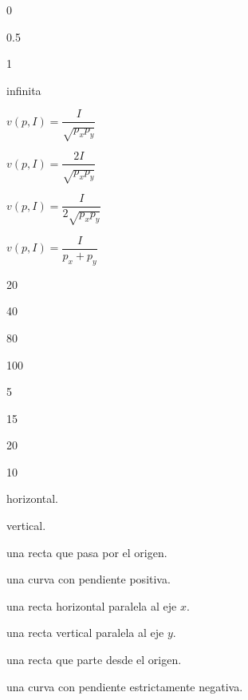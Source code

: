 \begin{opts}
    \item 0
    \item 0.5
    \item 1
    \item infinita
\end{opts}

\begin{opts}
    \item $v(p,I)=\dfrac{I}{\sqrt{p_xp_y}}$
    \item $v(p,I)=\dfrac{2I}{\sqrt{p_xp_y}}$
    \item $v(p,I)=\dfrac{I}{2\sqrt{p_xp_y}}$
    \item $v(p,I)=\dfrac{I}{p_x+p_y}$
\end{opts}

\begin{opts}
    \item 20
    \item 40
    \item 80
    \item 100
\end{opts}

\begin{opts}
    \item 5
    \item 15
    \item 20
    \item 10
\end{opts}

\begin{opts}
    \item horizontal.
    \item vertical.
    \item una recta que pasa por el origen.
    \item una curva con pendiente positiva.
\end{opts}

\begin{opts}
    \item una recta horizontal paralela al eje $x$.
    \item una recta vertical paralela al eje $y$.
    \item una recta que parte desde el origen.
    \item una curva con pendiente estrictamente negativa.
\end{opts}
